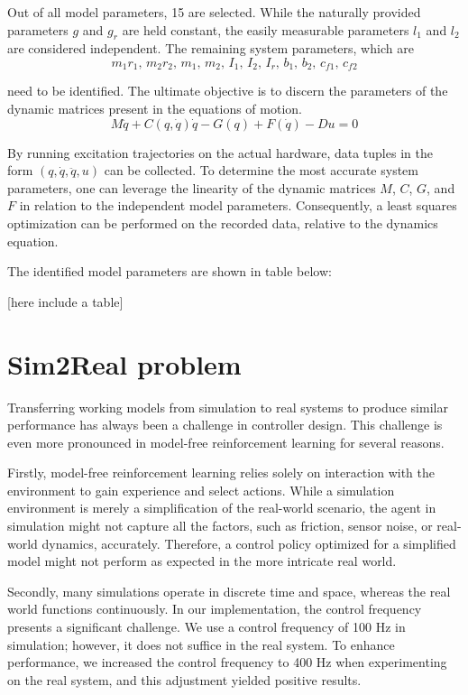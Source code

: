 Out of all model parameters, 15 are selected. While the naturally provided parameters \(g\) and \(g_r\) are held constant, the easily measurable parameters \(l_1\) and \(l_2\) are considered independent. The remaining system parameters, which are 
\[
m_1 r_1,\, m_2 r_2,\, m_1,\, m_2,\, I_1,\, I_2,\, I_r,\, b_1,\, b_2,\, c_{f1},\,c_{f2}
\]

need to be identified. The ultimate objective is to discern the parameters of the dynamic matrices present in the equations of motion.
\begin{equation}
M \ddot{q} + C(q, \dot{q}) \dot{q} - G(q) + F(\dot{q}) - D u = 0
\end{equation}

By running excitation trajectories on the actual hardware, data tuples in the form \((q, \dot{q}, \ddot{q}, u)\) can be collected. To determine the most accurate system parameters, one can leverage the linearity of the dynamic matrices \(M\), \(C\), \(G\), and \(F\) in relation to the independent model parameters. Consequently, a least squares optimization can be performed on the recorded data, relative to the dynamics equation.

The identified model parameters are shown in table below:

[here include a table]


\section{Sim2Real problem}
Transferring working models from simulation to real systems to produce similar performance has always been a challenge in controller design. This challenge is even more pronounced in model-free reinforcement learning for several reasons.

Firstly, model-free reinforcement learning relies solely on interaction with the environment to gain experience and select actions. While a simulation environment is merely a simplification of the real-world scenario, the agent in simulation might not capture all the factors, such as friction, sensor noise, or real-world dynamics, accurately. Therefore, a control policy optimized for a simplified model might not perform as expected in the more intricate real world.

Secondly, many simulations operate in discrete time and space, whereas the real world functions continuously. In our implementation, the control frequency presents a significant challenge. We use a control frequency of 100 Hz in simulation; however, it does not suffice in the real system. To enhance performance, we increased the control frequency to 400 Hz when experimenting on the real system, and this adjustment yielded positive results.

